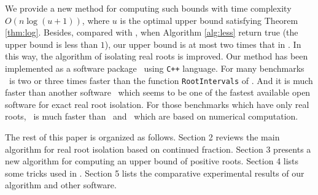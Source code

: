 We provide a new method for computing such bounds with time complexity $O(n\log(u+1))$, where $u$ is the optimal upper bound satisfying Theorem \ref{thm:log}. Besides, compared
with \cite{akr08}, when  Algorithm \ref{alg:less} return true (the upper bound is less than $1$), our upper bound is at most two times that in \cite{akr08}. In this way, the algorithm of   isolating real roots is improved.  Our  method has been implemented as a  software package \froot\ using \texttt{C++} language. For many benchmarks \froot \  is  two or three times
faster   than  the function {\tt RootIntervals} of \MM. And it  is much faster than   another software   \cf\  which seems to be one of the
fastest available open software for exact real root isolation. For those  benchmarks which  have only real roots, \froot\ is much faster than \sle\ and \eign\ which are based on numerical computation.


The rest of this paper is organized as follows. Section 2 reviews the
main algorithm for real root isolation based on  continued fraction. Section 3 presents a new algorithm for
computing an upper bound of positive roots. Section 4 lists some tricks used in \froot.  Section 5 lists the comparative experimental results of our algorithm and other software. %
